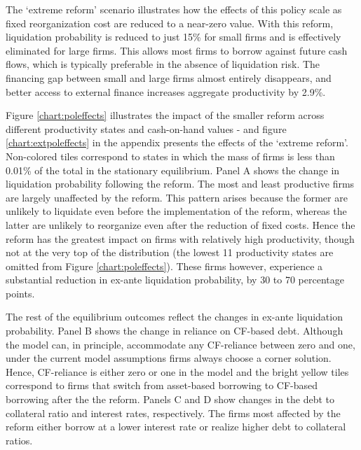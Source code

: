 \documentclass[12pt]{article}
\begin{document}
\noindent The `extreme reform' scenario illustrates how the effects of this policy scale as fixed reorganization cost are reduced to a near-zero value. With this reform, liquidation probability is reduced to just 15\% for small firms and is effectively eliminated for large firms. This allows most firms to borrow against future cash flows, which is typically preferable in the absence of liquidation risk. The financing gap between small and large firms almost entirely disappears, and better access to external finance increases aggregate productivity by 2.9\%. 

Figure \ref{chart:poleffects} illustrates the impact of the smaller reform across different productivity states and cash-on-hand values - and figure \ref{chart:extpoleffects} in the appendix presents the effects of the `extreme reform'. Non-colored tiles correspond to states in which the mass of firms is less than 0.01\% of the total in the stationary equilibrium. Panel A shows the change in liquidation probability following the reform. The most and least productive firms are largely unaffected by the reform. This pattern arises because the former are unlikely to liquidate even before the implementation of the reform, whereas the latter are unlikely to reorganize even after the reduction of fixed costs. Hence the reform has the greatest impact on firms with relatively high productivity, though not at the very top of the distribution (the lowest 11 productivity states are omitted from Figure \ref{chart:poleffects}). These firms however, experience a substantial reduction in ex-ante liquidation probability, by 30 to 70 percentage points. 

The rest of the equilibrium outcomes reflect the changes in ex-ante liquidation probability. Panel B shows the change in reliance on CF-based debt. Although the model can, in principle, accommodate any CF-reliance between zero and one, under the current model assumptions firms always choose a corner solution. Hence, CF-reliance is either zero or one in the model and the bright yellow tiles correspond to firms that switch from asset-based borrowing to CF-based borrowing after the the reform. Panels C and D show changes in the debt to collateral ratio and interest rates, respectively. The firms most affected by the reform either borrow at a lower interest rate or realize higher debt to collateral ratios. 
\end{document}
